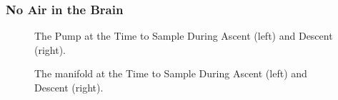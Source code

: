 \documentclass[a4paper,12pt,oneside]{article}
\begin{document}
\begin{appendices}
\subsubsection{No Air in the Brain}

\begin{figure}[H]
    \centering
    \hifll
    \caption{The Pump at the Time to Sample During Ascent (left) and Descent (right).}
    \label{fig:pump-no-air-in-brain}
\end{figure}

\begin{figure}[H]
    \centering
    \hifll
    \caption{The manifold at the Time to Sample During Ascent (left) and Descent (right).}
    \label{fig:structure-no-air}
\end{figure}


\end{appendices}
\end{document}
